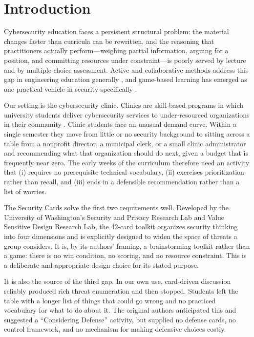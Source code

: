 \documentclass[10pt,twocolumn,letterpaper]{article}
\begin{document}
\vspace{0.8em}

\section{Introduction}

Cybersecurity education faces a persistent structural problem: the material
changes faster than curricula can be rewritten, and the reasoning that
practitioners actually perform---weighing partial information, arguing for a
position, and committing resources under constraint---is poorly served by
lecture and by multiple-choice assessment. Active and collaborative methods
address this gap in engineering education generally \cite{prince2004active},
and game-based learning has emerged as one practical vehicle in security
specifically \cite{plass2015gbl,wouters2013meta}.

Our setting is the cybersecurity clinic. Clinics are skill-based programs in
which university students deliver cybersecurity services to under-resourced
organizations in their community \cite{clinics_consortium}. Clinic students face
an unusual demand curve. Within a single semester they move from little or no
security background to sitting across a table from a nonprofit director, a
municipal clerk, or a small clinic administrator and recommending what that
organization should do next, given a budget that is frequently near zero. The
early weeks of the curriculum therefore need an activity that (i) requires no
prerequisite technical vocabulary, (ii) exercises prioritization rather than
recall, and (iii) ends in a defensible recommendation rather than a list of
worries.

The Security Cards \cite{denning2013securitycards} solve the first two
requirements well. Developed by the University of Washington's Security and
Privacy Research Lab and Value Sensitive Design Research Lab, the 42-card
toolkit organizes security thinking into four dimensions and is explicitly
designed to widen the space of threats a group considers. It is, by its
authors' framing, a brainstorming toolkit rather than a game: there is no win
condition, no scoring, and no resource constraint. This is a deliberate and
appropriate design choice for its stated purpose.

It is also the source of the third gap. In our own use, card-driven discussion
reliably produced rich threat enumeration and then stopped. Students left the
table with a longer list of things that could go wrong and no practiced
vocabulary for what to do about it. The original authors anticipated this and
suggested a ``Considering Defense'' activity, but supplied no defense cards, no
control framework, and no mechanism for making defensive choices costly.
\end{document}
